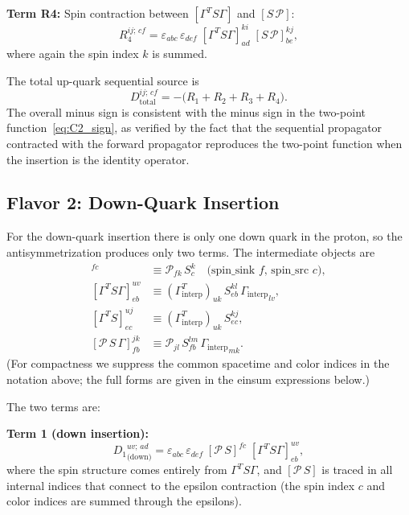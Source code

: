 \documentclass[11pt,a4paper]{article}
\newcommand{\eps}{\varepsilon}
\newcommand{\Gint}{\Gamma_{\text{interp}}}
\newcommand{\PolProj}{\mathcal{P}}
\newcommand{\fwprop}{S}
\begin{document}
\medskip\noindent
\textbf{Term R4:} Spin contraction between $[\Gamma^{T}\fwprop\Gamma]$ and
$[\fwprop\,\PolProj]$:
\begin{equation}
  \boxed{
  R_{4}^{ij;\,cf} =
  \eps_{abc}\,\eps_{def}\;
  [\Gamma^{T}\fwprop\Gamma]^{ki}_{ad}\;
  [\fwprop\,\PolProj]^{kj}_{be},
  }
  \label{eq:R4}
\end{equation}
where again the spin index $k$ is summed.

\medskip\noindent
The total up-quark sequential source is
\begin{equation}
  \boxed{
  D_{\text{total}}^{ij;\,cf} = -\big(R_{1} + R_{2} + R_{3} + R_{4}\big).
  }
  \label{eq:Dtotal}
\end{equation}
The overall minus sign is consistent with the minus sign in the two-point
function~\eqref{eq:C2_sign}, as verified by the fact that the sequential
propagator contracted with the forward propagator reproduces the two-point
function when the insertion is the identity operator.

\subsection{Flavor 2: Down-Quark Insertion}

For the down-quark insertion there is only one down quark in the proton, so the
antisymmetrization produces only two terms.  The intermediate objects are
\begin{align}
  [\PolProj\,\fwprop]^{fc} &\equiv \PolProj_{fk}\,\fwprop^{k}_{c}
    \quad\text{(spin\_sink $f$, spin\_src $c$)}, \label{eq:PDu_down} \\
  [\Gamma^{T}\fwprop\Gamma]^{uv}_{eb}
    &\equiv (\Gint^{T})_{uk}\,\fwprop^{kl}_{eb}\,{\Gint}_{lv},
    \label{eq:GtDG_down} \\
  [\Gamma^{T}\fwprop]^{uj}_{ec}
    &\equiv (\Gint^{T})_{uk}\,\fwprop^{kj}_{ec},
    \label{eq:GtD_down} \\
  [\PolProj\,\fwprop\,\Gamma]^{jk}_{fb}
    &\equiv \PolProj_{jl}\,\fwprop^{lm}_{fb}\,{\Gint}_{mk}.
    \label{eq:PDG_down}
\end{align}
(For compactness we suppress the common spacetime and color indices in the
notation above; the full forms are given in the einsum expressions below.)

\medskip\noindent
The two terms are:

\medskip\noindent
\textbf{Term 1 (down insertion):}
\begin{equation}
  \boxed{
  {D_{1}}^{uv;\,ad}_{\text{(down)}} =
  \eps_{abc}\,\eps_{def}\;
  [\PolProj\,\fwprop]^{fc}\;
  [\Gamma^{T}\fwprop\Gamma]^{uv}_{eb},
  }
  \label{eq:Ddown1}
\end{equation}
where the spin structure comes entirely from $\Gamma^{T}\fwprop\Gamma$, and
$[\PolProj\,\fwprop]$ is traced in all internal indices that connect to the
epsilon contraction (the spin index $c$ and color indices are summed through the
epsilons).
\end{document}
